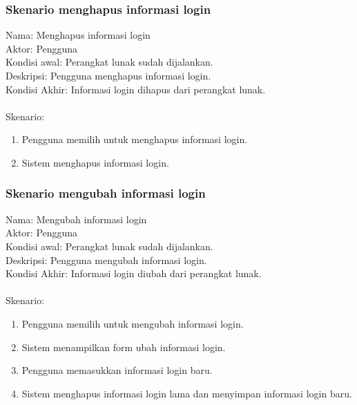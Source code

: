 \subsubsection{Skenario menghapus informasi login}
Nama: Menghapus informasi login\\
Aktor: Pengguna\\
Kondisi awal: Perangkat lunak sudah dijalankan.\\
Deskripsi: Pengguna menghapus informasi login.\\
Kondisi Akhir: Informasi login dihapus dari perangkat lunak.\\\\
Skenario:
\begin{enumerate}
    \item{Pengguna memilih untuk menghapus informasi login.}
    \item{Sistem menghapus informasi login.}
\end{enumerate}

\subsubsection{Skenario mengubah informasi login}
Nama: Mengubah informasi login\\
Aktor: Pengguna\\
Kondisi awal: Perangkat lunak sudah dijalankan.\\
Deskripsi: Pengguna mengubah informasi login.\\
Kondisi Akhir: Informasi login diubah dari perangkat lunak.\\\\
Skenario:
\begin{enumerate}
    \item{Pengguna memilih untuk mengubah informasi login.}
    \item{Sistem menampilkan form ubah informasi login.}
    \item{Pengguna memasukkan informasi login baru.}
    \item{Sistem menghapus informasi login lama dan menyimpan informasi login baru.}
\end{enumerate}

